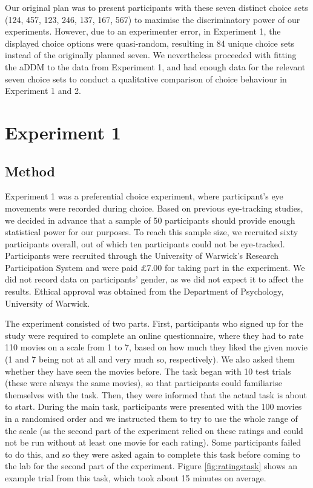 \documentclass[11pt,a4paper]{article}
\begin{document}
Our original plan was to present participants with these seven distinct choice sets (124, 457, 123, 246, 137, 167, 567) to maximise the discriminatory power of our experiments. However, due to an experimenter error, in Experiment 1, the displayed choice options were quasi-random, resulting in 84 unique choice sets instead of the originally planned seven. We nevertheless proceeded with fitting the aDDM to the data from Experiment 1, and had enough data for the relevant seven choice sets to conduct a qualitative comparison of choice behaviour in Experiment 1 and 2.


\section{Experiment 1}

\subsection{Method} \label{chap1exp1method}

Experiment 1 was a preferential choice experiment, where participant's eye movements were recorded during choice. Based on previous eye-tracking studies, we decided in advance that a sample of 50 participants should provide enough statistical power for our purposes. To reach this sample size, we recruited sixty participants overall, out of which ten participants could not be eye-tracked. Participants were recruited through the University of Warwick's Research Participation System and were paid £7.00 for taking part in the experiment. We did not record data on participants' gender, as we did not expect it to affect the results. Ethical approval was obtained from the Department of Psychology, University of Warwick.

The experiment consisted of two parts. First, participants who signed up for the study were required to complete an online questionnaire, where they had to rate 110 movies on a scale from 1 to 7, based on how much they liked the given movie (1 and 7 being not at all and very much so, respectively). We also asked them whether they have seen the movies before. The task began with 10 test trials (these were always the same movies), so that participants could familiarise themselves with the task. Then, they were informed that the actual task is about to start. During the main task, participants were presented with the 100 movies in a randomised order and we instructed them to try to use the whole range of the scale (as the second part of the experiment relied on these ratings and could not be run without at least one movie for each rating). Some participants failed to do this, and so they were asked again to complete this task before coming to the lab for the second part of the experiment. Figure \ref{fig:ratingstask} shows an example trial from this task, which took about 15 minutes on average. 
\end{document}
